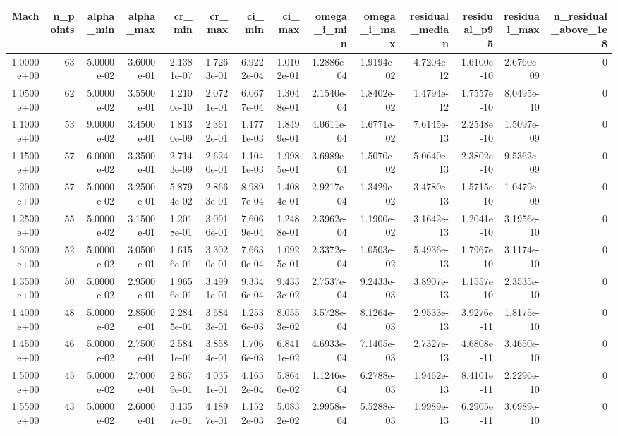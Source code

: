 \begin{tabular}{rrrrrrrrrrrrrr}
\toprule
Mach & n_points & alpha_min & alpha_max & cr_min & cr_max & ci_min & ci_max & omega_i_min & omega_i_max & residual_median & residual_p95 & residual_max & n_residual_above_1e8 \\
\midrule
1.0000e+00 & 63 & 5.0000e-02 & 3.6000e-01 & -2.1381e-07 & 1.7263e-01 & 6.9222e-04 & 1.0102e-01 & 1.2886e-04 & 1.9194e-02 & 4.7204e-12 & 1.6100e-10 & 2.6760e-09 & 0 \\
1.0500e+00 & 62 & 5.0000e-02 & 3.5500e-01 & 1.2100e-10 & 2.0721e-01 & 6.0677e-04 & 1.3048e-01 & 2.1540e-04 & 1.8402e-02 & 1.4794e-12 & 1.7557e-10 & 8.0495e-10 & 0 \\
1.1000e+00 & 53 & 9.0000e-02 & 3.4500e-01 & 1.8130e-09 & 2.3612e-01 & 1.1771e-03 & 1.8499e-01 & 4.0611e-04 & 1.6771e-02 & 7.6145e-13 & 2.2548e-10 & 1.5097e-09 & 0 \\
1.1500e+00 & 57 & 6.0000e-02 & 3.3500e-01 & -2.7143e-09 & 2.6240e-01 & 1.1041e-03 & 1.9985e-01 & 3.6989e-04 & 1.5070e-02 & 5.0640e-13 & 2.3802e-10 & 9.5362e-09 & 0 \\
1.2000e+00 & 57 & 5.0000e-02 & 3.2500e-01 & 5.8794e-02 & 2.8663e-01 & 8.9897e-04 & 1.4084e-01 & 2.9217e-04 & 1.3429e-02 & 3.4780e-13 & 1.5715e-10 & 1.0479e-09 & 0 \\
1.2500e+00 & 55 & 5.0000e-02 & 3.1500e-01 & 1.2018e-01 & 3.0916e-01 & 7.6069e-04 & 1.2488e-01 & 2.3962e-04 & 1.1900e-02 & 3.1642e-13 & 1.2041e-10 & 3.1956e-10 & 0 \\
1.3000e+00 & 52 & 5.0000e-02 & 3.0500e-01 & 1.6156e-01 & 3.3020e-01 & 7.6630e-04 & 1.0925e-01 & 2.3372e-04 & 1.0503e-02 & 5.4936e-13 & 1.7967e-10 & 3.1174e-10 & 0 \\
1.3500e+00 & 50 & 5.0000e-02 & 2.9500e-01 & 1.9656e-01 & 3.4991e-01 & 9.3346e-04 & 9.4333e-02 & 2.7537e-04 & 9.2433e-03 & 3.8907e-13 & 1.1557e-10 & 2.3535e-10 & 0 \\
1.4000e+00 & 48 & 5.0000e-02 & 2.8500e-01 & 2.2845e-01 & 3.6843e-01 & 1.2536e-03 & 8.0553e-02 & 3.5728e-04 & 8.1264e-03 & 2.9533e-13 & 3.9276e-11 & 1.8175e-10 & 0 \\
1.4500e+00 & 46 & 5.0000e-02 & 2.7500e-01 & 2.5841e-01 & 3.8584e-01 & 1.7066e-03 & 6.8411e-02 & 4.6933e-04 & 7.1405e-03 & 2.7327e-13 & 4.6808e-11 & 3.4650e-10 & 0 \\
1.5000e+00 & 45 & 5.0000e-02 & 2.7000e-01 & 2.8679e-01 & 4.0351e-01 & 4.1652e-04 & 5.8640e-02 & 1.1246e-04 & 6.2788e-03 & 1.9462e-13 & 8.4101e-11 & 2.2296e-10 & 0 \\
1.5500e+00 & 43 & 5.0000e-02 & 2.6000e-01 & 3.1357e-01 & 4.1897e-01 & 1.1522e-03 & 5.0832e-02 & 2.9958e-04 & 5.5288e-03 & 1.9989e-13 & 6.2905e-11 & 3.6989e-10 & 0 \\

\end{tabular}

